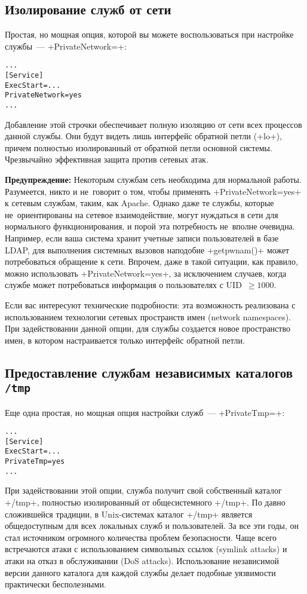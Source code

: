 \documentclass[10pt,oneside,a4paper]{article}
\newenvironment{caveat}[1][]{\smallskip\par\textbf{Предупреждение#1: }}%
	{\smallskip\par}
\begin{document}
\subsection{Изолирование служб от сети}

Простая, но мощная опция, которой вы можете воспользоваться при настройке
службы~--- +PrivateNetwork=+:
\begin{Verbatim}
...
[Service]
ExecStart=...
PrivateNetwork=yes
...
\end{Verbatim}
Добавление этой строчки обеспечивает полную изоляцию от сети всех процессов
данной службы. Они будут видеть лишь интерфейс обратной петли (+lo+), причем
полностью изолированный от обратной петли основной системы.  Чрезвычайно
эффективная защита против сетевых атак.

\begin{caveat}
Некоторым службам сеть необходима для нормальной работы. Разумеется, никто и
не~говорит о том, чтобы применять +PrivateNetwork=yes+ к сетевым службам, таким,
как Apache. Однако даже те службы, которые не~ориентированы на сетевое
взаимодействие, могут нуждаться в сети для нормального функционирования, и порой
эта потребность не~вполне очевидна. Например, если ваша система хранит
учетные записи пользователей в базе LDAP, для выполнения системных вызовов
наподобие +getpwnam()+ может потребоваться обращение к сети.  Впрочем, даже в
такой ситуации, как правило, можно использовать +PrivateNetwork=yes+, за
исключением случаев, когда службе может потребоваться информация о пользователях
с UID~$\geq1000$.
\end{caveat}

Если вас интересуют технические подробности: эта возможность реализована с
использованием технологии сетевых пространств имен (network namespaces). При
задействовании данной опции, для службы создается новое пространство имен, в
котором настраивается только интерфейс обратной петли.

\subsection{Предоставление службам независимых каталогов \texttt{/tmp}}

Еще одна простая, но мощная опция настройки служб~--- +PrivateTmp=+:
\begin{Verbatim}
...
[Service]
ExecStart=...
PrivateTmp=yes
...
\end{Verbatim}
При задействовании этой опции, служба получит свой собственный каталог +/tmp+,
полностью изолированный от общесистемного +/tmp+. По давно сложившейся традиции,
в Unix-системах каталог +/tmp+ является общедоступным для всех локальных служб и
пользователей. За все эти годы, он стал источником огромного количества проблем
безопасности. Чаще всего встречаются атаки с использованием символьных ссылок
(symlink attacks) и атаки на отказ в обслуживании (DoS attacks). Использование 
независимой версии данного каталога для каждой службы делает подобные уязвимости
практически бесполезными.
\end{document}
